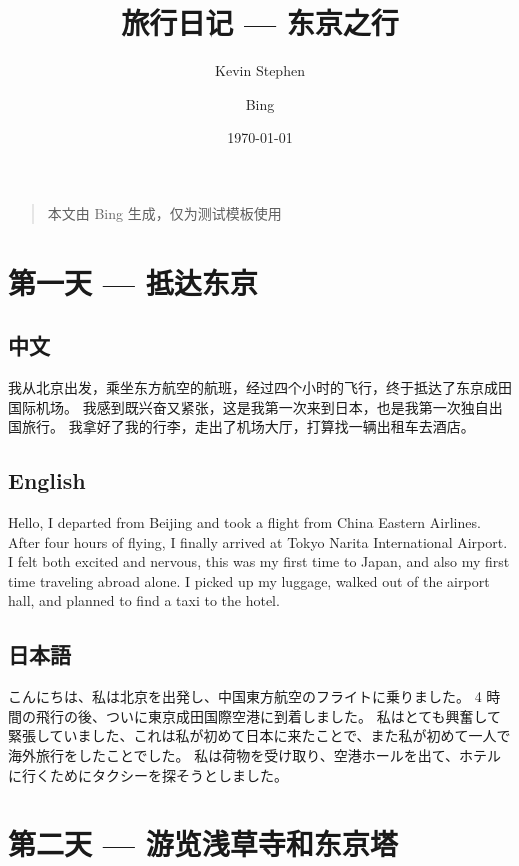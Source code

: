 \documentclass{kspaper}
\title{旅行日记 --- 东京之行}
\author{Kevin Stephen \and Bing}
\date{\today}
\begin{document}
\maketitle

\tableofcontents

\clearpage

\begin{quotation}
    \color{red}
    本文由 Bing 生成，仅为测试模板使用
\end{quotation}

\section{第一天 --- 抵达东京}

\subsection{中文}

我从北京出发，乘坐东方航空的航班，经过四个小时的飞行，终于抵达了东京成田国际机场。
我感到既兴奋又紧张，这是我第一次来到日本，也是我第一次独自出国旅行。
我拿好了我的行李，走出了机场大厅，打算找一辆出租车去酒店。

\subsection{English}

Hello, I departed from Beijing and took a flight from China Eastern Airlines.
After four hours of flying, I finally arrived at Tokyo Narita International Airport.
I felt both excited and nervous, this was my first time to Japan, and also my first time traveling abroad alone.
I picked up my luggage, walked out of the airport hall, and planned to find a taxi to the hotel.

\subsection{日本語}

こんにちは、私は北京を出発し、中国東方航空のフライトに乗りました。
4 時間の飛行の後、ついに東京成田国際空港に到着しました。
私はとても興奮して緊張していました、これは私が初めて日本に来たことで、また私が初めて一人で海外旅行をしたことでした。
私は荷物を受け取り、空港ホールを出て、ホテルに行くためにタクシーを探そうとしました。

\section{第二天 --- 游览浅草寺和东京塔}
\end{document}
